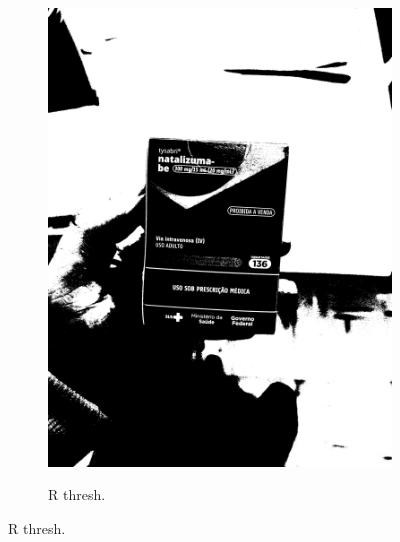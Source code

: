 \begin{figure}[htb]
\begin{subfigure}[t]{0.21\textwidth}
        \includegraphics[width=\linewidth]{../pictures/tysabri_gray_thresh.jpg}
    \end{subfigure}
    \hfill
    \begin{subfigure}[t]{0.21\textwidth}
        \centering
        \caption{R thresh.}
        \label{fig:foto:versoes:1:R_thresh}

\end{subfigure}
\end{figure}
